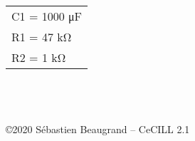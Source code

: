 \documentclass{kicad}
\begin{document}
\begin{center}
~\\
~\\
\\
~\\
~\\
\begin{tabular}{l}
C1 = 1000 \si{\micro\farad}\\
R1 = 47 \si{\kilo\ohm}\\
R2 = 1 \si{\kilo\ohm}\\
\end{tabular}
\\
~\\
\\
\vfill
\scriptsize
\copyright 2020 Sébastien Beaugrand -- CeCILL 2.1
\end{center}
\end{document}
